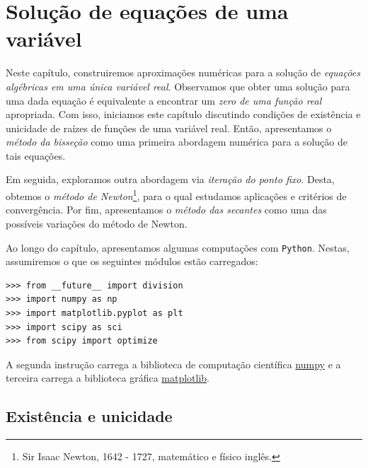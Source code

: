 
%

\chapter{Solução de equações de uma variável}\label{cap:equacao1d}

Neste capítulo, construiremos aproximações numéricas para a solução de \emph{equações algébricas em uma única variável real}. Observamos que obter uma solução para uma dada equação é equivalente a encontrar um \emph{zero de uma função real} apropriada. Com isso, iniciamos este capítulo discutindo condições de existência e unicidade de raízes de funções de uma variável real. Então, apresentamos o \emph{método da bisseção} como uma primeira abordagem numérica para a solução de tais equações.

Em seguida, exploramos outra abordagem via \emph{iteração do ponto fixo}. Desta, obtemos o \emph{método de Newton}\footnote{Sir Isaac Newton, 1642 - 1727, matemático e físico inglês.}, para o qual estudamos aplicações e critérios de convergência. Por fim, apresentamos o \emph{método das secantes} como uma das possíveis variações do método de Newton.

\ifispython
Ao longo do capítulo, apresentamos algumas computações com \verb+Python+. Nestas, assumiremos o que os seguintes módulos estão carregados:
\begin{verbatim}
>>> from __future__ import division
>>> import numpy as np
>>> import matplotlib.pyplot as plt
>>> import scipy as sci
>>> from scipy import optimize
\end{verbatim}
A segunda instrução carrega a biblioteca de computação científica \href{http://www.numpy.org/}{numpy} e a terceira carrega a biblioteca gráfica \href{https://matplotlib.org/}{matplotlib}.
\fi

\section{Existência e unicidade}

